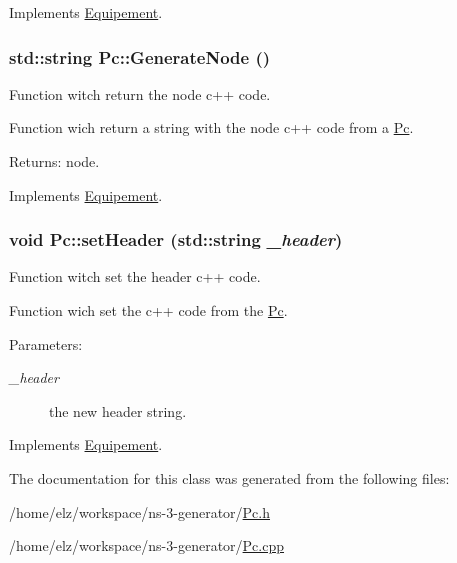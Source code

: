 Implements \hyperlink{class_equipement_98eda1e24e07c343712dcd35eba6bd18}{Equipement}.\hypertarget{class_pc_36ace04642cd481b39d312b51c37c114}{
\subsubsection[{GenerateNode}]{\setlength{\rightskip}{0pt plus 5cm}std::string Pc::GenerateNode ()}}
\label{class_pc_36ace04642cd481b39d312b51c37c114}


Function witch return the node c++ code. 

Function wich return a string with the node c++ code from a \hyperlink{class_pc}{Pc}.

\begin{Desc}
\item[Returns:]node. \end{Desc}


Implements \hyperlink{class_equipement_e03cafed5e059dfe332643719c8d8dd4}{Equipement}.\hypertarget{class_pc_8049628cd139b39cbae2327e70ca0eb7}{
\subsubsection[{setHeader}]{\setlength{\rightskip}{0pt plus 5cm}void Pc::setHeader (std::string {\em \_\-header})}}
\label{class_pc_8049628cd139b39cbae2327e70ca0eb7}


Function witch set the header c++ code. 

Function wich set the c++ code from the \hyperlink{class_pc}{Pc}.

\begin{Desc}
\item[Parameters:]
\begin{description}
\item[{\em \_\-header}]the new header string. \end{description}
\end{Desc}


Implements \hyperlink{class_equipement_9068d14ff2c67d06be75a21ebc9fbcd7}{Equipement}.

The documentation for this class was generated from the following files:\begin{CompactItemize}
\item 
/home/elz/workspace/ns-3-generator/\hyperlink{_pc_8h}{Pc.h}\item 
/home/elz/workspace/ns-3-generator/\hyperlink{_pc_8cpp}{Pc.cpp}\end{CompactItemize}
